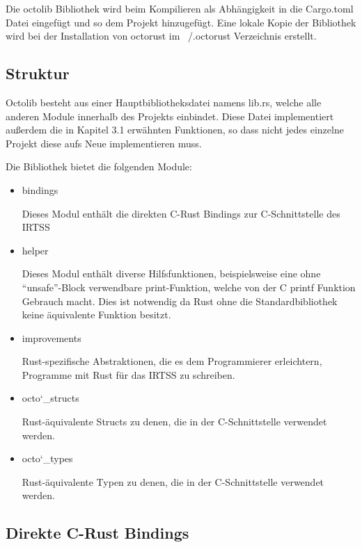 Die octolib Bibliothek wird beim Kompilieren als Abhängigkeit in die Cargo.toml Datei eingefügt und so dem Projekt hinzugefügt.
Eine lokale Kopie der Bibliothek wird bei der Installation von octorust im ~/.octorust Verzeichnis erstellt.

\subsection{Struktur}

Octolib besteht aus einer Hauptbibliotheksdatei namens lib.rs, welche alle anderen Module innerhalb des Projekts einbindet. Diese
Datei implementiert außerdem die in Kapitel 3.1 erwähnten Funktionen, so dass nicht jedes einzelne Projekt diese aufs Neue
implementieren muss.

Die Bibliothek bietet die folgenden Module:

\begin{itemize}

	\item{bindings}
	
	Dieses Modul enthält die direkten C-Rust Bindings zur C-Schnittstelle des IRTSS	
	
	\item{helper}
	
	Dieses Modul enthält diverse Hilfsfunktionen, beispielsweise eine ohne ``unsafe''-Block verwendbare print-Funktion, welche
	von der C printf Funktion Gebrauch macht. Dies ist notwendig da Rust ohne die Standardbibliothek keine äquivalente Funktion
	besitzt.
	
	\item{improvements}
	
	Rust-spezifische Abstraktionen, die es dem Programmierer erleichtern, Programme mit Rust für das IRTSS zu schreiben.
	
	\item{octo\char`_structs}
	
	Rust-äquivalente Structs zu denen, die in der C-Schnittstelle verwendet werden.
	
	\item{octo\char`_types}
	
	Rust-äquivalente Typen zu denen, die in der C-Schnittstelle verwendet werden.

\end{itemize}

\subsection{Direkte C-Rust Bindings}

